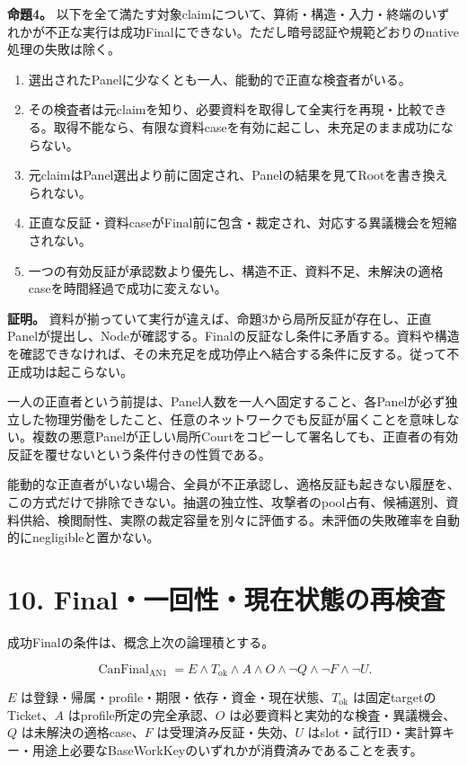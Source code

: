 \documentclass[
  10pt,
]{article}
\providecommand{\tightlist}{%
  \setlength{\itemsep}{0pt}\setlength{\parskip}{0pt}}
\begin{document}
\textbf{命題4。}
以下を全て満たす対象claimについて、算術・構造・入力・終端のいずれかが不正な実行は成功Finalにできない。ただし暗号認証や規範どおりのnative処理の失敗は除く。

\begin{enumerate}
\def\labelenumi{\arabic{enumi}.}
\tightlist
\item
  選出されたPanelに少なくとも一人、能動的で正直な検査者がいる。
\item
  その検査者は元claimを知り、必要資料を取得して全実行を再現・比較できる。取得不能なら、有限な資料caseを有効に起こし、未充足のまま成功にならない。
\item
  元claimはPanel選出より前に固定され、Panelの結果を見てRootを書き換えられない。
\item
  正直な反証・資料caseがFinal前に包含・裁定され、対応する異議機会を短縮されない。
\item
  一つの有効反証が承認数より優先し、構造不正、資料不足、未解決の適格caseを時間経過で成功に変えない。
\end{enumerate}

\textbf{証明。}
資料が揃っていて実行が違えば、命題3から局所反証が存在し、正直Panelが提出し、Nodeが確認する。Finalの反証なし条件に矛盾する。資料や構造を確認できなければ、その未充足を成功停止へ結合する条件に反する。従って不正成功は起こらない。

一人の正直者という前提は、Panel人数を一人へ固定すること、各Panelが必ず独立した物理労働をしたこと、任意のネットワークでも反証が届くことを意味しない。複数の悪意Panelが正しい局所Courtをコピーして署名しても、正直者の有効反証を覆せないという条件付きの性質である。

能動的な正直者がいない場合、全員が不正承認し、適格反証も起きない履歴を、この方式だけで排除できない。抽選の独立性、攻撃者のpool占有、候補選別、資料供給、検閲耐性、実際の裁定容量を別々に評価する。未評価の失敗確率を自動的にnegligibleと置かない。

\section{10.
Final・一回性・現在状態の再検査}\label{finalux4e00ux56deux6027ux73feux5728ux72b6ux614bux306eux518dux691cux67fb}

成功Finalの条件は、概念上次の論理積とする。

\[\operatorname{CanFinal}_{\mathrm{AN1}}=E\land T_{\mathrm{ok}}\land A\land O\land\neg Q\land\neg F\land\neg U.\]

\(E\)
は登録・帰属・profile・期限・依存・資金・現在状態、\(T_{\mathrm{ok}}\)
は固定targetのTicket、\(A\) はprofile所定の完全承認、\(O\)
は必要資料と実効的な検査・異議機会、\(Q\) は未解決の適格case、\(F\)
は受理済み反証・失効、\(U\)
はslot・試行ID・実計算キー・用途上必要なBaseWorkKeyのいずれかが消費済みであることを表す。
\end{document}
